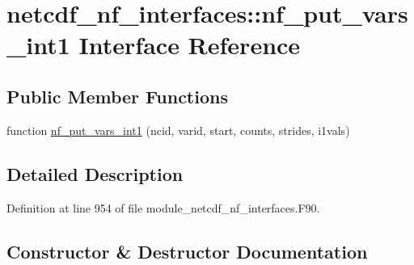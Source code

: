 \hypertarget{interfacenetcdf__nf__interfaces_1_1nf__put__vars__int1}{}\section{netcdf\+\_\+nf\+\_\+interfaces\+:\+:nf\+\_\+put\+\_\+vars\+\_\+int1 Interface Reference}
\label{interfacenetcdf__nf__interfaces_1_1nf__put__vars__int1}
\subsection*{Public Member Functions}
\begin{DoxyCompactItemize}
\item 
function \hyperlink{interfacenetcdf__nf__interfaces_1_1nf__put__vars__int1_a21bf7498b50c12d502d7c8a38e7a1c83}{nf\+\_\+put\+\_\+vars\+\_\+int1} (ncid, varid, start, counts, strides, i1vals)
\end{DoxyCompactItemize}


\subsection{Detailed Description}


Definition at line 954 of file module\+\_\+netcdf\+\_\+nf\+\_\+interfaces.\+F90.



\subsection{Constructor \& Destructor Documentation}
\mbox{\label{interfacenetcdf__nf__interfaces_1_1nf__put__vars__int1_a21bf7498b50c12d502d7c8a38e7a1c83}} 

